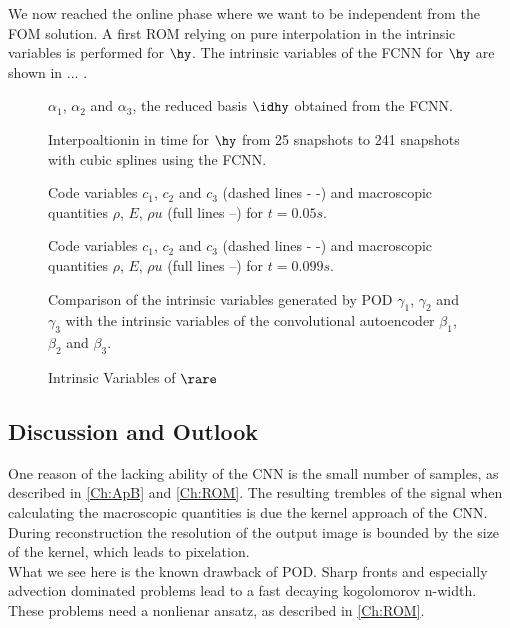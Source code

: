 We now reached the online phase where we want to be independent from the FOM solution. A first ROM relying on pure interpolation in the intrinsic variables is performed for \(\hy\). The intrinsic variables of the FCNN for \(\hy\) are shown in ... . 
\begin{figure}
	
	\caption{\(\alpha_1\), \(\alpha_2\) and \(\alpha_3\), the reduced basis \(\idhy\) obtained from the FCNN.}
\end{figure}
\begin{figure}
	
	\caption{Interpoaltionin in time for \(\hy\) from 25 snapshots to 241 snapshots with cubic splines using the FCNN.}
\end{figure}
\begin{figure}[!htbp]
	\scalebox{1}{}
	\caption{Code variables \(c_1\), \(c_2\) and \(c_3\) (dashed lines - -) and macroscopic quantities \(\rho\), \(E\), \(\rho u\) (full lines --) for \(t=0.05s\).}
\end{figure}
\begin{figure}[!htbp]
	\scalebox{1}{}
	\caption{Code variables \(c_1\), \(c_2\) and \(c_3\) (dashed lines - -) and macroscopic quantities \(\rho\), \(E\), \(\rho u\) (full lines --) for \(t=0.099s\).}
\end{figure}
\begin{figure}[!htbp]
	\scalebox{.6}{}
	\caption{Comparison of the intrinsic variables generated by POD \(\gamma_1\), \(\gamma_2\) and \(\gamma_3\) with the intrinsic variables of the convolutional autoencoder \(\beta_1\), \(\beta_2\) and \(\beta_3\).}
\end{figure}
\begin{figure}[!hp]
	\scalebox{0.9}{}
	\caption{Intrinsic Variables of $\rare$}
\end{figure}
\subsection{Discussion and Outlook}
 One reason of the lacking ability of the CNN is the small number of samples, as described in \cref{Ch:ApB} and \cref{Ch:ROM}. The resulting trembles of the signal when calculating the macroscopic quantities is due the kernel approach of the CNN. During reconstruction the resolution of the output image is bounded by the size of the kernel, which leads to pixelation.\\
  What we see here is the known drawback of POD. Sharp fronts and especially advection dominated problems lead to a fast decaying kogolomorov n-width. These problems need a nonlienar ansatz, as described in \cref{Ch:ROM}.